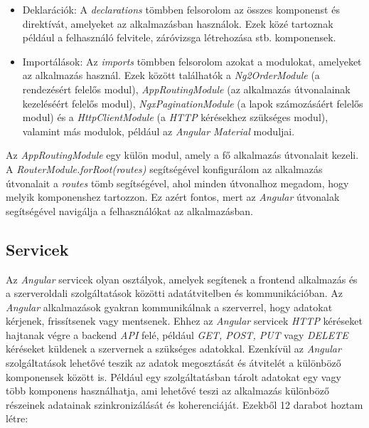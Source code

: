\begin{itemize}

\item{Deklarációk:} A \textit{declarations} tömbben felsorolom az összes komponenst és direktívát, amelyeket az alkalmazásban használok. Ezek közé tartoznak például a felhasználó felvitele, záróvizsga létrehozása stb. komponensek. 

\item{Importálások:} Az \textit{imports} tömbben felsorolom azokat a modulokat, amelyeket az alkalmazás használ. Ezek között találhatók a \textit{Ng2OrderModule} (a rendezésért felelős modul), \textit{AppRoutingModule} (az alkalmazás útvonalainak kezeléséért felelős modul), \textit{NgxPaginationModule} (a lapok számozásáért felelős modul) és a \textit{HttpClientModule} (a \textit{HTTP} kérésekhez szükséges modul), valamint más modulok, például az \textit{Angular Material} moduljai.

\end{itemize}

Az \textit{AppRoutingModule} egy külön modul, amely a fő alkalmazás útvonalait kezeli. A \textit{RouterModule.forRoot(routes)} segítségével konfigurálom az alkalmazás útvonalait a \textit{routes} tömb segítségével, ahol minden útvonalhoz megadom, hogy melyik komponenshez tartozzon. Ez azért fontos, mert az \textit{Angular} útvonalak segítségével navigálja a felhasználókat az alkalmazásban.

\subsection{Servicek}

Az \textit{Angular} servicek olyan osztályok, amelyek segítenek a frontend alkalmazás és a szerveroldali  szolgáltatások közötti adatátvitelben és kommunikációban. Az \textit{Angular} alkalmazások gyakran kommunikálnak a szerverrel, hogy adatokat kérjenek, frissítsenek vagy mentsenek. Ehhez az \textit{Angular} servicek \textit{HTTP} kéréseket hajtanak végre a backend \textit{API} felé, például \textit{GET, POST, PUT} vagy \textit{DELETE} kéréseket küldenek a szervernek a szükséges adatokkal. Ezenkívül az \textit{Angular} szolgáltatások lehetővé teszik az adatok megosztását és átvitelét a különböző komponensek között is. Például egy szolgáltatásban tárolt adatokat egy vagy több komponens használhatja, ami lehetővé teszi az alkalmazás különböző részeinek adatainak szinkronizálását és koherenciáját. Ezekből 12 darabot hoztam létre:

